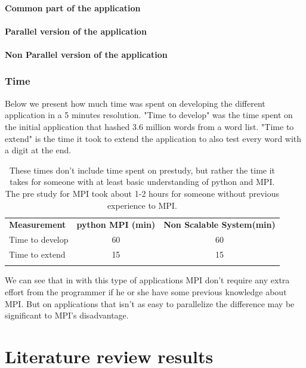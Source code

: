 \documentclass{article}
\begin{document}
{\paragraph{Common part of the application}
{\small}
\paragraph{Parallel version of the application}
{\small}
\paragraph{Non Parallel version of the application}
{\small}

\subsubsection{Time}
Below we present how much time was spent on developing the different
application in a 5 minutes resolution. "Time to develop" was the time spent on
the initial application that hashed 3.6 million words from a word list. "Time
to extend" is the time it took to extend the application to also test every
word with a digit at the end.

\begin{table}[h!]
\begin{tabular}{l c c}
  \rowcolor[gray]{0.5}
  {\bf Measurement} & {\bf python MPI (min)} & {\bf Non Scalable System(min)} \\
  Time to develop &  60  &  60 \\
  Time to extend   &   15  &  15  \\
\rowcolor[gray]{0.5}
\end{tabular}
\caption{ These times don't include time spent on prestudy, but rather the time
it takes for someone with at least basic understanding of python and MPI. The
pre study for MPI took about 1-2 hours for someone without previous experience
to MPI.}
\end{table}

We can see that in with this type of applications MPI don't require any extra
effort from the programmer if he or she have some previous knowledge about MPI.
But on applications that isn't as easy to parallelize the difference may be 
significant to MPI's disadvantage.

 
\section{Literature review results}

}
\end{document}
